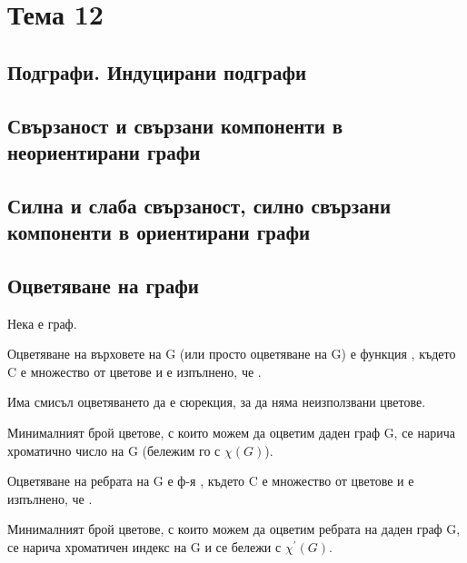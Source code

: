 \section{Тема 12}

\subsection*{Подграфи. Индуцирани подграфи}

\subsection*{Свързаност и свързани компоненти в неориентирани графи}

\subsection*{Силна и слаба свързаност, силно свързани компоненти в ориентирани графи}

\subsection*{Оцветяване на графи}
Нека \graf е граф.

\begin{definition}
    Оцветяване на върховете на G (или просто оцветяване на G) е функция , където 
    C е множество от цветове и е изпълнено, че .
\end{definition}

\begin{note}
    Има смисъл оцветяването да е сюрекция, за да няма неизползвани цветове.
\end{note}

\begin{definition}
    Минималният брой цветове, с които можем да оцветим даден граф G, се нарича хроматично число на G 
    (бележим го с \(\chi(G)\)).
\end{definition}

\begin{definition}
    Оцветяване на ребрата на G е ф-я , където C е множество от цветове и е изпълнено, че 
    .
\end{definition}

\begin{definition}
    Минималният брой цветове, с които можем да оцветим ребрата на даден граф G, се нарича хроматичен 
    индекс на G и се бележи с \(\chi^{'}(G)\).
\end{definition}

